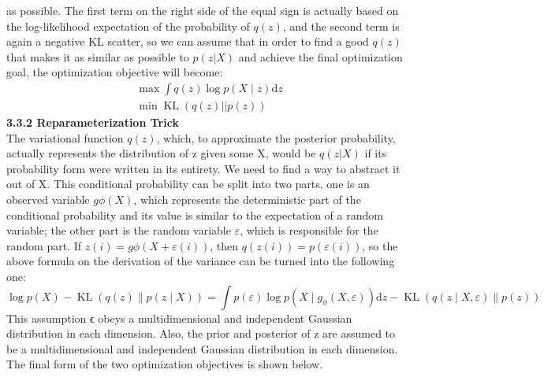 \documentclass[
]{article}
\begin{document}
as possible. The first term on the right side of the equal sign is
actually based on the log-likelihood expectation of the probability of
\(q(z)\), and the second term is again a negative KL scatter, so we can
assume that in order to find a good \(q(z)\) that makes it as similar as
possible to \(p(z|X)\) and achieve the final optimization goal, the
optimization objective will become:
$$
\begin{aligned}
&\max \int q(z) \log p(X \mid z) \mathrm{d} z\\
&\min \operatorname{KL}(q(z)|| p(z))
\end{aligned}
$$
{\bfseries \small 3.3.2 Reparameterization Trick} \\
The variational function \(q(z)\), which, to approximate the posterior
probability, actually represents the distribution of z given some X,
would be \(q(z|X)\) if its probability form were written in its
entirety. We need to find a way to abstract it out of X. This
conditional probability can be split into two parts, one is an observed
variable \(gϕ(X)\), which represents the deterministic part of the
conditional probability and its value is similar to the expectation of a
random variable; the other part is the random variable \(ε\), which is
responsible for the random part. If \(z(i)=gϕ(X+ε(i))\), then
\(q(z(i))=p(ε(i))\), so the above formula on the derivation of the
variance can be turned into the following one:
$$
\log p(X)-\operatorname{KL}(q(z) \| p(z \mid X))=\int p(\varepsilon) \log p\left(X \mid g_\phi(X, \varepsilon)\right) \mathrm{d} z-\operatorname{KL}(q(z \mid X, \varepsilon) \| p(z))
$$
This assumption ϵ obeys a multidimensional and independent Gaussian
distribution in each dimension. Also, the prior and posterior of z are
assumed to be a multidimensional and independent Gaussian distribution
in each dimension. The final form of the two optimization objectives is
shown below.
\end{document}
